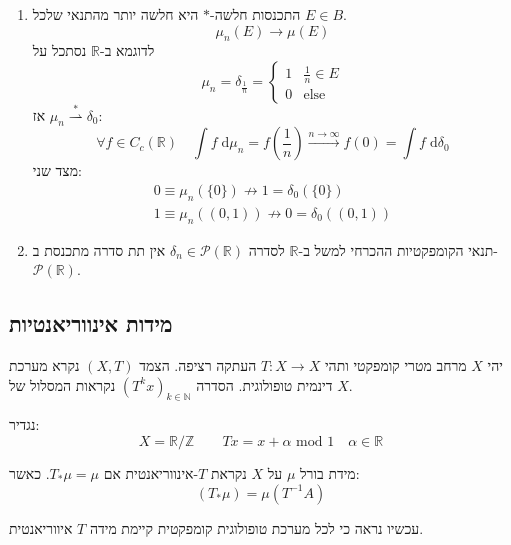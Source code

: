 \documentclass{tstextbook}
\begin{document}
\begin{remark}
  \begin{enumerate}
    \item התכנסות חלשה-\(*\) היא חלשה יותר מהתנאי שלכל \(E \in B\). 
$$\mu_{n}(E)\to \mu(E)$$
לדוגמא ב-\(\mathbb{R}\) נסתכל על 
$$\mu_{n}=\delta_{\frac{1}{n}} = \begin{cases} 1  &  \frac{1}{n}\in E \\0 & \text{else}
\end{cases}$$
אז \(\mu_{n}\overset{*}{\rightharpoonup} \delta_{0}\):
$$\forall f \in C_{c}\left( \mathbb{R} \right)\quad \int f \;\mathrm{d} \mu_{n}= f\left(  \frac{1}{n} \right)\xrightarrow{n\to \infty}f(0)=\int f \;\mathrm{d} \delta_{0}  $$
מצד שני:
$$\begin{gather}0\equiv \mu_{n}\left( \{ 0 \} \right) \not \to 1 = \delta_{0}\left( \{ 0 \} \right)  \\1\equiv \mu_{n}((0,1)) \not \to 0 =\delta_{0}((0,1))
\end{gather}$$


    \item תנאי הקומפקטיות ההכרחי למשל ב-\(\mathbb{R}\) לסדרה \(\delta_{n} \in \mathcal{P}\left( \mathbb{R} \right)\) אין תת סדרה מתכנסת ב-\(\mathcal{P}\left( \mathbb{R} \right)\). 


  \end{enumerate}
\end{remark}
\subsection{מידות אינווריאנטיות}

יהי \(X\) מרחב מטרי קומפקטי ותהי \(T:X \to X\) העתקה רציפה. הצמד \((X,T)\) נקרא מערכת דינמית טופולוגית. הסדרה \((T^{k}x)_{k \in \mathbb{N}}\) נקראות המסלול של \(X\).

\begin{example}
נגדיר:
$$X=\mathbb{R} / \mathbb{Z} \qquad  Tx = x+\alpha \text{ mod }1 \quad  \alpha \in \mathbb{R}$$

\end{example}
\begin{definition}
מידת בורל \(\mu\) על \(X\) נקראת \(T\)-אינווריאנטית אם \(T_{*}\mu = \mu\). כאשר:
$$\left( T_{*}\mu \right)=\mu(T^{-1}A)$$

\end{definition}
עכשיו נראה כי לכל מערכת טופולוגית קומפקטית קיימת מידה \(T\) איווריאנטית.
\end{document}
